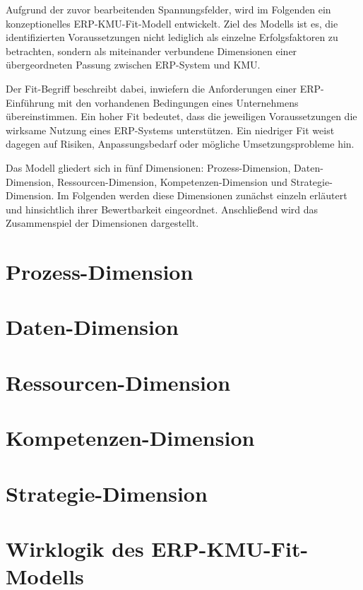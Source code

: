 
Aufgrund der zuvor bearbeitenden Spannungsfelder, wird im Folgenden ein konzeptionelles ERP-KMU-Fit-Modell
entwickelt. Ziel des Modells ist es,
die identifizierten Voraussetzungen nicht lediglich als einzelne Erfolgsfaktoren 
zu betrachten, sondern als miteinander verbundene Dimensionen einer übergeordneten Passung zwischen ERP-System und KMU.

Der Fit-Begriff beschreibt dabei, inwiefern die Anforderungen einer ERP-Einführung mit den vorhandenen Bedingungen 
eines Unternehmens übereinstimmen. Ein hoher Fit bedeutet, dass die jeweiligen Voraussetzungen die wirksame Nutzung 
eines ERP-Systems unterstützen. Ein niedriger Fit weist dagegen auf Risiken, Anpassungsbedarf oder mögliche 
Umsetzungsprobleme hin.

Das Modell gliedert sich in fünf Dimensionen: Prozess-Dimension, Daten-Dimension, Ressourcen-Dimension, 
Kompetenzen-Dimension und Strategie-Dimension. Im Folgenden werden diese Dimensionen zunächst 
einzeln erläutert und hinsichtlich ihrer Bewertbarkeit eingeordnet. Anschließend wird das Zusammenspiel der Dimensionen dargestellt.


\section{Prozess-Dimension}


\section{Daten-Dimension}


\section{Ressourcen-Dimension}

    
\section{Kompetenzen-Dimension}


\section{Strategie-Dimension}


\section{Wirklogik des ERP-KMU-Fit-Modells}

